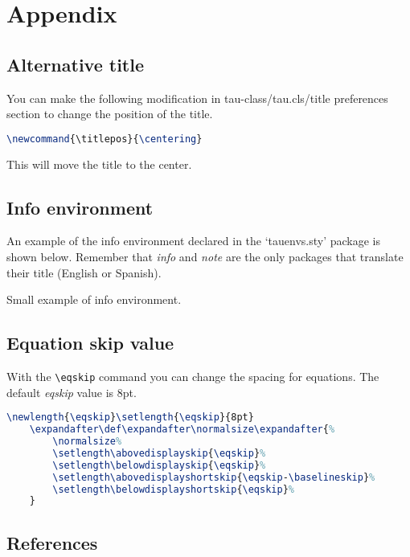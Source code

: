 \documentclass[9pt,a4paper,twoside]{tau-class/tau}
\begin{document}
\section{Appendix}

    \subsection{Alternative title}

        You can make the following modification in tau-class/tau.cls/title preferences section to change the position of the title.

\nolinenumbers
\begin{lstlisting}[language=TeX, caption=Alternative title.]
\newcommand{\titlepos}{\centering}
\end{lstlisting}
\linenumbers

	This will move the title to the center. 

    \subsection{Info environment}

        An example of the info environment declared in the ‘tauenvs.sty’ package is shown below. Remember that \textit{info} and \textit{note} are the only packages that translate their title (English or Spanish).
		
	\begin{info}
		Small example of info environment.
	\end{info}

    \subsection{Equation skip value}

        With the \verb|\eqskip| command you can change the spacing for equations. The default \textit{eqskip} value is 8pt.

\nolinenumbers
\begin{lstlisting}[language=TeX, caption=Equation skip code.]
\newlength{\eqskip}\setlength{\eqskip}{8pt}
	\expandafter\def\expandafter\normalsize\expandafter{%
		\normalsize%
		\setlength\abovedisplayskip{\eqskip}%
		\setlength\belowdisplayskip{\eqskip}%
		\setlength\abovedisplayshortskip{\eqskip-\baselineskip}%
		\setlength\belowdisplayshortskip{\eqskip}%
	}
\end{lstlisting}
\linenumbers
		
    \subsection{References}
		
\end{document}
